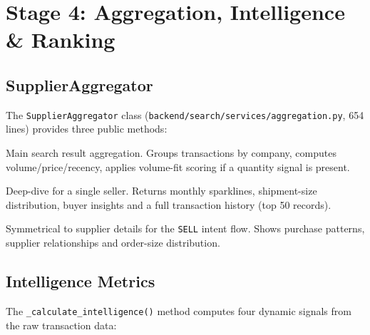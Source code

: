 \documentclass[12pt,a4paper]{article}
\begin{document}
\newpage
\section{Stage 4: Aggregation, Intelligence \& Ranking}
\label{sec:ranking}

\subsection{SupplierAggregator}

The \texttt{SupplierAggregator} class (\texttt{backend/search/services/aggregation.py},
654 lines) provides three public methods:

\begin{description}[leftmargin=2.5cm]
  \item[\texttt{get\_suppliers\_for\_subcategories()}] Main search result aggregation.
        Groups transactions by company, computes volume/price/recency, applies
        volume-fit scoring if a quantity signal is present.

  \item[\texttt{get\_supplier\_details()}] Deep-dive for a single seller.
        Returns monthly sparklines, shipment-size distribution, buyer insights and a
        full transaction history (top 50 records).

  \item[\texttt{get\_buyer\_details()}] Symmetrical to supplier details for the
        \texttt{SELL} intent flow.  Shows purchase patterns, supplier relationships and
        order-size distribution.
\end{description}

\subsection{Intelligence Metrics}

The \texttt{\_calculate\_intelligence()} method computes four dynamic signals from
the raw transaction data:
\end{document}

